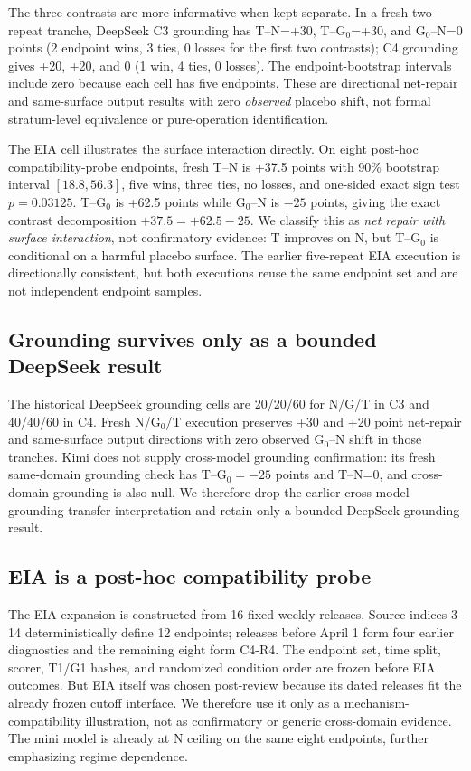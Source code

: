 The three contrasts are more informative when kept separate. In a fresh two-repeat tranche, DeepSeek C3 grounding has T--N=+30, T--G$_0$=+30, and G$_0$--N=0 points (2 endpoint wins, 3 ties, 0 losses for the first two contrasts); C4 grounding gives +20, +20, and 0 (1 win, 4 ties, 0 losses). The endpoint-bootstrap intervals include zero because each cell has five endpoints. These are directional net-repair and same-surface output results with zero \emph{observed} placebo shift, not formal stratum-level equivalence or pure-operation identification.

The EIA cell illustrates the surface interaction directly. On eight post-hoc compatibility-probe endpoints, fresh T--N is +37.5 points with 90\% bootstrap interval $[18.8,56.3]$, five wins, three ties, no losses, and one-sided exact sign test $p=0.03125$. T--G$_0$ is +62.5 points while G$_0$--N is $-25$ points, giving the exact contrast decomposition $+37.5=+62.5-25$. We classify this as \emph{net repair with surface interaction}, not confirmatory evidence: T improves on N, but T--G$_0$ is conditional on a harmful placebo surface. The earlier five-repeat EIA execution is directionally consistent, but both executions reuse the same endpoint set and are not independent endpoint samples.

\subsection{Grounding survives only as a bounded DeepSeek result}
The historical DeepSeek grounding cells are 20/20/60 for N/G/T in C3 and 40/40/60 in C4. Fresh N/G$_0$/T execution preserves +30 and +20 point net-repair and same-surface output directions with zero observed G$_0$--N shift in those tranches. Kimi does not supply cross-model grounding confirmation: its fresh same-domain grounding check has T--G$_0=-25$ points and T--N=0, and cross-domain grounding is also null. We therefore drop the earlier cross-model grounding-transfer interpretation and retain only a bounded DeepSeek grounding result.

\subsection{EIA is a post-hoc compatibility probe}
The EIA expansion is constructed from 16 fixed weekly releases. Source indices 3--14 deterministically define 12 endpoints; releases before April 1 form four earlier diagnostics and the remaining eight form C4-R4. The endpoint set, time split, scorer, T1/G1 hashes, and randomized condition order are frozen before EIA outcomes. But EIA itself was chosen post-review because its dated releases fit the already frozen cutoff interface. We therefore use it only as a mechanism-compatibility illustration, not as confirmatory or generic cross-domain evidence. The mini model is already at N ceiling on the same eight endpoints, further emphasizing regime dependence.

